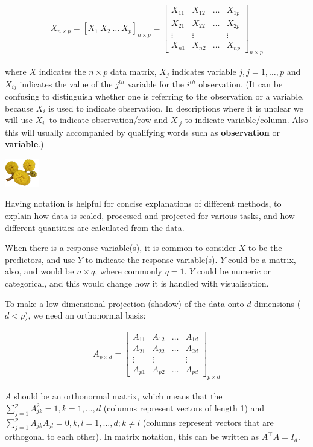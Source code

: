\documentclass[
  letterpaper,
]{krantz}
\newcommand{\infobox}[1]{%
\noindent\colorbox{info!30}{%
\begin{minipage}{0.98\linewidth}%
    \centering%
    \begin{minipage}[c]{0.15\linewidth} %
      \includegraphics[width=1.5cm]{images/mulga-flowers2.png} %
    \end{minipage}%
    \hfill %
    \begin{minipage}[c]{0.8\linewidth} %
      \bigskip%
      \textsf{#1}%
      \bigskip%
    \end{minipage}%
    \hspace*{3mm}%
  \end{minipage}%
}%
}
\begin{document}
\begin{eqnarray*}
X_{n\times p} =
[X_1~X_2~\dots~X_p]_{n\times p} = \left[ \begin{array}{cccc}
X_{11} & X_{12} & \dots & X_{1p} \\
X_{21} & X_{22} & \dots & X_{2p}\\
\vdots & \vdots &  & \vdots \\
X_{n1} & X_{n2} & \dots & X_{np} \end{array} \right]_{n\times p}
\end{eqnarray*}

where \(X\) indicates the \(n\times p\) data matrix, \(X_j\) indicates
variable \(j, j=1, \dots, p\) and \(X_{ij}\) indicates the value of the
\(j^{th}\) variable for the \(i^{th}\) observation. (It can be confusing
to distinguish whether one is referring to the observation or a
variable, because \(X_i\) is used to indicate observation. In
descriptions where it is unclear we will use \(X_{i.}\) to indicate
observation/row and \(X_{.j}\) to indicate variable/column. Also this
will usually accompanied by qualifying words such as
\textbf{observation} or \textbf{variable}.)

\infobox{Having notation is helpful for concise explanations of different methods, to explain how data is scaled, processed and projected for various tasks, and how different quantities are calculated from the data. }

When there is a response variable(s), it is common to consider \(X\) to
be the predictors, and use \(Y\) to indicate the response variable(s).
\(Y\) could be a matrix, also, and would be \(n\times q\), where
commonly \(q=1\). \(Y\) could be numeric or categorical, and this would
change how it is handled with visualisation.

To make a low-dimensional projection (shadow) of the data onto \(d\)
dimensions (\(d < p\)), we need an orthonormal basis:

\begin{eqnarray*}
A_{p\times d} = \left[ \begin{array}{cccc}
A_{11} & A_{12} & \dots & A_{1d} \\
A_{21} & A_{22} & \dots & A_{2d}\\
\vdots & \vdots &  & \vdots \\
A_{p1} & A_{p2} & \dots & A_{pd} \end{array} \right]_{p\times d}
\end{eqnarray*}

\(A\) should be an orthonormal matrix, which means that the
\(\sum_{j=1}^p A_{jk}^2=1, k=1, \dots, d\) (columns represent vectors of
length 1) and \(\sum_{j=1}^p A_{jk}A_{jl}=0, k,l=1, \dots, d; k\neq l\)
(columns represent vectors that are orthogonal to each other). In matrix
notation, this can be written as \(A^{\top}A = I_d\).
\end{document}
